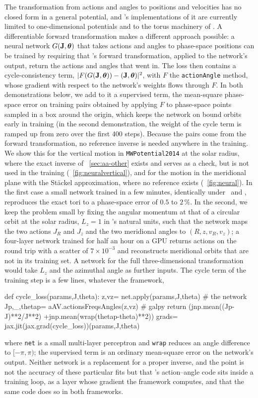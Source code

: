 The transformation from actions and angles to positions and velocities
has no closed form in a general potential, and \galpy's implementations
of it are currently limited to one-dimensional potentials and to the
torus machinery of \citet{BinneyMcMillan2016}. A differentiable forward transformation makes a different
approach possible: a neural network $G(\mathbf{J},\boldsymbol\theta)$ that takes actions
and angles to phase-space positions can be trained by requiring that
\galpy's forward transformation, applied to the network's output,
return the actions and angles that went in. The loss then contains a
cycle-consistency term, $|F(G(\mathbf{J},\boldsymbol\theta))-(\mathbf{J},\boldsymbol\theta)|^2$, with $F$ the
\texttt{actionAngle} method, whose gradient with respect to
the network's weights flows through $F$. In both demonstrations below,
we add to it a supervised term, the mean-square phase-space error on
training pairs obtained by applying $F$ to phase-space points sampled
in a box around the origin, which keeps the network on bound orbits
early in training (in the second demonstration, the weight of the cycle
term is ramped up from zero over the first 400 steps). Because the
pairs come from the forward transformation, no reference inverse is
needed anywhere in the training. We show this for the vertical motion in
\texttt{MWPotential2014} at the solar radius, where the exact inverse of \sectionname~\ref{sec:aa-other} exists and
serves as a check, but is not used in the training (\figurename~\ref{fig:neuralvertical}), and for the
motion in the meridional plane with the St\"{a}ckel approximation, where
no reference exists (\figurename~\ref{fig:neural}). In the first case a
small network trained in a few minutes, identically under \jax\ and
\torch, reproduces the exact tori to a phase-space error of $0.5$ to
$2\,\%$. In the second, we keep the problem small by fixing the angular
momentum at that of a circular orbit at the solar radius, $L_z = 1$ in
\galpy's natural units, such that the network maps the two actions $J_R$
and $J_z$ and the two meridional angles to $(R,z,v_R,v_z)$; a four-layer
network trained for half an hour on a GPU returns actions on the round
trip with a scatter of $7\times10^{-3}$ and reconstructs meridional
orbits that are not in its training set. A network for the full
three-dimensional transformation would take $L_z$ and the azimuthal
angle as further inputs. The cycle term of the training step is a few lines, whatever the framework,
\begin{code}
def cycle_loss(params,J,theta):
    z,vz= net.apply(params,J,theta) # the network
    Jp,_,thetap= aAV.actionsFreqsAngles(z,vz) # galpy
    return (jnp.mean((Jp-J)**2/J**2)
            +jnp.mean(wrap(thetap-theta)**2))
grads= jax.jit(jax.grad(cycle_loss))(params,J,theta)
\end{code}
where \texttt{net} is a small multi-layer perceptron and \texttt{wrap}
reduces an angle difference to $[-\pi,\pi)$; the supervised term is an
ordinary mean-square error on the network's output. Neither
network is a replacement for a proper inverse, and the point is not the
accuracy of these particular fits but that \galpy's action--angle code
sits inside a training loop, as a layer whose gradient the framework
computes, and that the same code does so in both frameworks.

